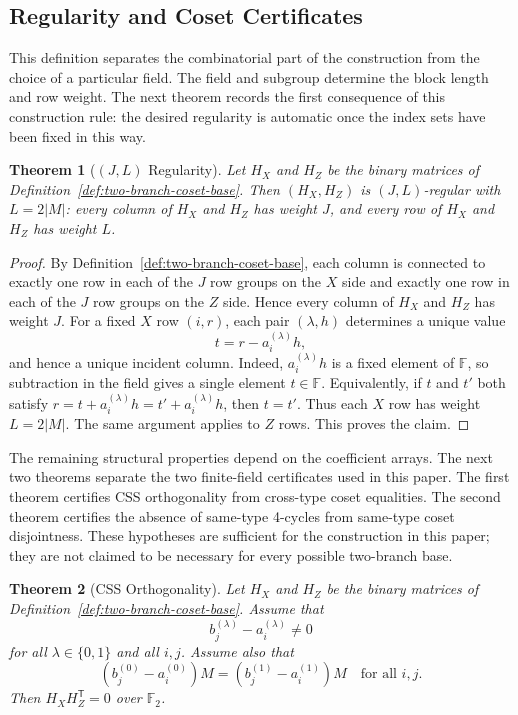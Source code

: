 \documentclass[11pt,a4paper]{article}
\newcommand{\F}{\mathbb{F}}
\newcommand{\HX}{H_X}
\newcommand{\HZ}{H_Z}
\theoremstyle{uprighttheorem}
\newtheorem{theorem}{Theorem}
\begin{document}
\subsection{Regularity and Coset Certificates}\label{subsec:base-certificates}

This definition separates the combinatorial part of the construction from the choice of a particular field.
The field and subgroup determine the block length and row weight.
The next theorem records the first consequence of this construction rule: the desired regularity is automatic once the index sets have been fixed in this way.

\begin{theorem}[\texorpdfstring{$(J,L)$}{(J,L)} Regularity]\label{thm:two-branch-regularity}
Let $\HX$ and $\HZ$ be the binary matrices of Definition~\ref{def:two-branch-coset-base}.
Then $(\HX,\HZ)$ is $(J,L)$-regular with $L=2|M|$: every column of $\HX$ and $\HZ$ has weight $J$, and every row of $\HX$ and $\HZ$ has weight $L$.
\end{theorem}

\begin{proof}
By Definition~\ref{def:two-branch-coset-base}, each column is connected to exactly one row in each of the $J$ row groups on the $X$ side and exactly one row in each of the $J$ row groups on the $Z$ side.
Hence every column of $\HX$ and $\HZ$ has weight $J$.
For a fixed $X$ row $(i,r)$, each pair $(\lambda,h)$ determines a unique value
\[
  t=r-a_i^{(\lambda)}h,
\]
and hence a unique incident column.
Indeed, \(a_i^{(\lambda)}h\) is a fixed element of \(\F\), so subtraction in the field gives a single element \(t\in\F\).
Equivalently, if \(t\) and \(t'\) both satisfy \(r=t+a_i^{(\lambda)}h=t'+a_i^{(\lambda)}h\), then \(t=t'\).
Thus each $X$ row has weight $L=2|M|$.
The same argument applies to $Z$ rows.
This proves the claim.
\end{proof}

The remaining structural properties depend on the coefficient arrays.
The next two theorems separate the two finite-field certificates used in this paper.
The first theorem certifies CSS orthogonality from cross-type coset equalities.
The second theorem certifies the absence of same-type 4-cycles from same-type coset disjointness.
These hypotheses are sufficient for the construction in this paper; they are not claimed to be necessary for every possible two-branch base.

\begin{theorem}[CSS Orthogonality]\label{thm:orthogonality-coset-condition}
Let $\HX$ and $\HZ$ be the binary matrices of Definition~\ref{def:two-branch-coset-base}.
Assume that
\begin{equation}
\label{eq:cross-nonzero}
  b_j^{(\lambda)}-a_i^{(\lambda)}\ne0
\end{equation}
for all $\lambda\in\{0,1\}$ and all $i,j$.
Assume also that
\begin{equation}
\label{eq:cross-coset-equality}
  (b_j^{(0)}-a_i^{(0)})M=(b_j^{(1)}-a_i^{(1)})M
  \quad\text{for all } i,j.
\end{equation}
Then $\HX\HZ^{\mathsf T}=0$ over $\F_2$.
\end{theorem}
\end{document}
